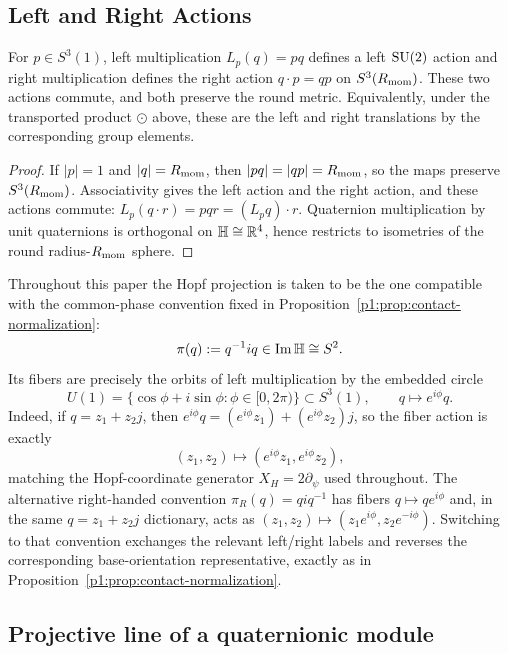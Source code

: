 \documentclass[11pt]{article}
\begin{document}
\subsection{Left and Right Actions}

\begin{proposition}
\label{p1:prop:unit-quaternion-left-right-actions}
For $p\in S^3(1)$, left multiplication $L_p(q)=pq$ defines a left $\mathrm{SU}(2)$
action and right multiplication defines the right action $q\cdot p=qp$ on
$S^3(R_{\mathrm{mom}})$. These two actions commute, and both preserve the round metric.
Equivalently, under the transported product $\odot$ above, these are the left
and right translations by the corresponding group elements.
\cite{helgason1984groups}
\end{proposition}
\begin{proof}
If $|p|=1$ and $|q|=R_{\mathrm{mom}}$, then $|pq|=|qp|=R_{\mathrm{mom}}$, so the maps preserve
$S^3(R_{\mathrm{mom}})$. Associativity gives the left action and the right action, and these
actions commute: $L_p(q\cdot r)=pqr=(L_pq)\cdot r$. Quaternion multiplication by
unit quaternions is orthogonal on $\mathbb{H}\cong\mathbb{R}^4$, hence restricts to isometries
of the round radius-$R_{\mathrm{mom}}$ sphere.
\end{proof}

Throughout this paper the Hopf projection is taken to be the one compatible with
the common-phase convention fixed in Proposition~\ref{p1:prop:contact-normalization}:
\[
    \pi(q):=q^{-1} i q\in \operatorname{Im}\mathbb{H}\cong S^2.
\]
Its fibers are precisely the orbits of left multiplication by the embedded
circle
\[
U(1) = \{ \cos\phi + i\sin\phi : \phi \in [0,2\pi) \} \subset S^3(1),
\qquad q\mapsto e^{i\phi}q.
\]
Indeed, if $q=z_1+z_2j$, then $e^{i\phi}q=(e^{i\phi}z_1)+(e^{i\phi}z_2)j$,
so the fiber action is exactly
\[
(z_1,z_2)\longmapsto(e^{i\phi}z_1,e^{i\phi}z_2),
\]
matching the Hopf-coordinate generator $X_H=2\partial_\psi$ used throughout.
The alternative right-handed convention $\pi_R(q)=q i q^{-1}$ has fibers
$q\mapsto q e^{i\phi}$ and, in the same $q=z_1+z_2j$ dictionary, acts as
$(z_1,z_2)\mapsto(z_1e^{i\phi},z_2e^{-i\phi})$.  Switching to that convention
exchanges the relevant left/right labels and reverses the corresponding
base-orientation representative, exactly as in Proposition~\ref{p1:prop:contact-normalization}.


\subsection{Projective line of a quaternionic module}
\label{p1:subsec:proj-line-quat}
\end{document}
